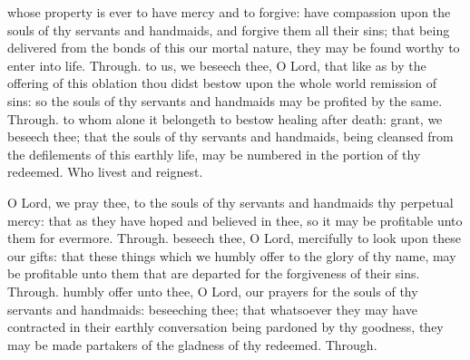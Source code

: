 \begin{multicols}{2}
 whose property is ever to have mercy and to forgive: have compassion upon the souls of thy servants and handmaids, and forgive them all their sins; that being delivered from the bonds of this our mortal nature, they may be found worthy to enter into life. Through.
 to us, we beseech thee, O Lord, that like as by the offering of this oblation thou didst bestow upon the whole world remission of sins: so the souls of thy servants and handmaids may be profited by the same. Through.
 to whom alone it belongeth to bestow healing after death: grant, we beseech thee; that the souls of thy servants and handmaids, being cleansed from the defilements of this earthly life, may be numbered in the portion of thy redeemed. Who livest and reignest.

 O Lord, we pray thee, to the souls of thy servants and handmaids thy perpetual mercy: that as they have hoped and believed in thee, so it may be profitable unto them for evermore. Through.
 beseech thee, O Lord, mercifully to look upon these our gifts: that these things which we humbly offer to the glory of thy name, may be profitable unto them that are departed for the forgiveness of their sins. Through.
 humbly offer unto thee, O Lord, our prayers for the souls of thy servants and handmaids: beseeching thee; that whatsoever they may have contracted in their earthly conversation being pardoned by thy goodness, they may be made partakers of the gladness of thy redeemed. Through.
\end{multicols}